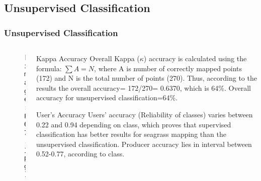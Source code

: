 \documentclass[pdflatex,compress,9pt,
	xcolor={dvipsnames,dvipsnames,svgnames,x11names,table},
	hyperref={colorlinks = true,breaklinks = true, urlcolor = NavyBlue, breaklinks = true}]{beamer}
\begin{document}
\subsection{Unsupervised Classification}
\begin{frame}\frametitle{\alert{Unsupervised} Classification}
\begin{minipage}[0.4\textheight]{\textwidth}
\begin{columns}[T]
\begin{column}{0.5\textwidth}
\vspace{1em}
\begin{figure}[H]
	\centering
		\texttt{[image: F67.jpg]}
\end{figure}
\end{column}

\begin{column}{0.5\textwidth}
\footnotesize{\begin{alertblock}{Kappa Accuracy}
Overall Kappa ($\kappa$) accuracy is calculated using the formula: $\sum A=N$,
where A is number of correctly mapped points (172) and N is the total number of points (270). Thus, according to the results the overall accuracy= 172/270= 0.6370, which is 64\%. Overall accuracy for unsupervised classification=64\%.
\end{alertblock}

\begin{block}{User's Accuracy}
Users' accuracy (Reliability of classes) varies between 0.22 and 0.94 depending on class, which proves that supervised classification has better results for seagrass mapping than the unsupervised classification. Producer accuracy lies in interval between 0.52-0.77, according to class.
\end{block}}

\end{column}
\end{columns}
\end{minipage}

\end{frame}
\end{document}

